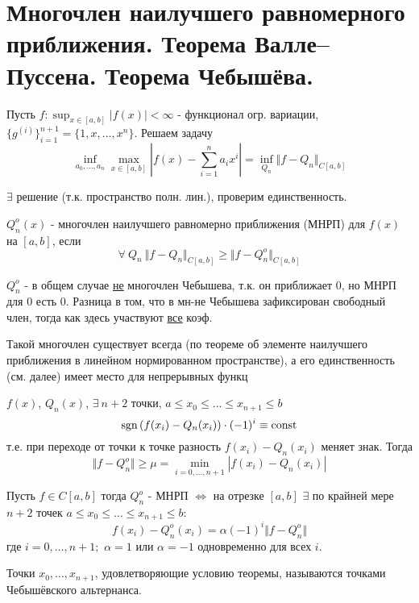 \section{Многочлен наилучшего равномерного приближения. Теорема Валле–Пуссена. Теорема Чебышёва.}
Пусть $f:\sup_{x\in[a,b]}|f(x)|<\infty$ - функционал огр. вариации, $\{g^{(i)}\}_{i=1}^{n+1}=\{1,x,\ldots,x^n\}$. Решаем задачу
\begin{equation}\label{contig::task}
  \inf_{a_0,\ldots,a_n}\max_{x\in[a,b]}\left|f(x)-\sum_{i=1}^na_ix^i\right|=\inf_{Q_n}\Vert f-Q_n\Vert_{C[a,b]}
\end{equation}

$\exists$ решение (т.к. пространство полн. лин.), проверим единственность.
\begin{definition}
  $Q_n^o(x)$ - многочлен наилучшего равномерно приближения (МНРП) для $f(x)$ на $[a,b]$,
  если $$\forall\ Q_n\ \Vert f- Q_n\Vert_{C[a,b]}\geq\Vert f- Q_n^o\Vert_{C[a,b]}$$
\end{definition}
\begin{remark*}
  $Q_n^o$ - в общем случае \underline{не} многочлен Чебышева, т.к. он приближает 0,
  но МНРП для 0 есть 0. Разница в том, что в мн-не Чебышева зафиксирован свободный член, тогда
  как здесь участвуют \underline{все} коэф.
\end{remark*}
\begin{remark*}
  Такой многочлен существует всегда (по теореме об элементе наилучшего
  приближения в линейном нормированном пространстве), а его единственность (см. далее) имеет место для непрерывных функц
\end{remark*}
\begin{theorem}
  $f(x)$, $Q_n(x)$, $\exists\ n+2$ точки, $a\leq x_0\leq\ldots\leq x_{n+1}\leq b$
  $$\operatorname{sgn}{\left(f(x_i)-Q_n(x_i)\right)}\cdot (-1)^i\equiv\mathrm{const}$$
  т.е. при переходе от точки к точке разность $f(x_i)-Q_n(x_i)$ меняет знак. Тогда
  $$\Vert f- Q_n^o\Vert\geq\mu=\min_{i=0,\ldots,n+1}\left|f(x_i)-Q_n(x_i)\right|$$
\end{theorem}
\begin{theorem}[Чебышев]
  Пусть $f\in C[a,b]$ тогда $Q_n^o$ - МНРП $\Leftrightarrow$ на отрезке $[a,b]$ $\exists$
  по крайней мере $n+2$ точек $a\leq x_0\leq\ldots\leq x_{n+1}\leq b$:
  $$f(x_i)-Q_n^o(x_i)=\alpha(-1)^i\Vert f-Q_n^o\Vert$$
  где $i=0,\ldots, n+1;$ $\alpha=1$ или $\alpha=-1$ одновременно для всех $i$.
\end{theorem}
Точки $x_0,\ldots,x_{n+1}$, удовлетворяющие условию теоремы, называются точками Чебышёвского альтернанса.
